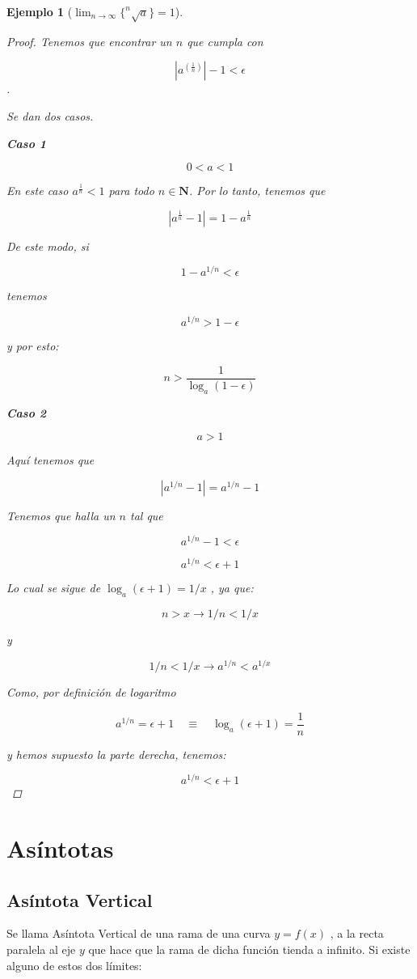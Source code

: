 \documentclass[12pt,a4paper]{article}
\newtheorem{ejs}{Ejemplo}[section]
\begin{document}
\begin{ejs}[\(\lim_{n \to \infty} \{ ^n\sqrt{a}  \} = 1\)]
\begin{proof}
Tenemos que encontrar un \( n \) que cumpla con 

\[ |a^{(\frac{1}{n})}| - 1 < \epsilon \].

Se dan dos casos.

\textbf{Caso 1}

\[ 0<a<1 \]

En este caso \( a^{\frac{1}{n}} < 1 \) para todo \( n \in \mathbf{N}
\). Por lo tanto, tenemos que


\[ |a^{\frac{1}{n}}-1| = 1 - a^{\frac{1}{n}} \]

De este modo, si


\[ 1 - a^{1/n} < \epsilon \]

tenemos


\[ a^{1/n} > 1 - \epsilon \]

y por esto:

\[ n > \frac{1 }{\log_a(1-\epsilon)} \]


\textbf{Caso 2}


\[ a > 1 \]

Aqu\'i tenemos que 


\[ | a^{1/n}-1| = a^{1/n}-1 \]

Tenemos que halla un \( n \) tal que

\[ a^{1/n}-1 < \epsilon \]

\[ a^{1/n} < \epsilon +1\]


Lo cual se sigue de \( \log_a(\epsilon+1)=1/x \) , ya que:


\[ n > x \to 1/n < 1/x \]

y


\[ 1/n < 1/x \to a^{1/n} < a^{1/x} \]

Como, por definici\'on de logaritmo


\[ a^{1/n} = \epsilon+1 \quad \equiv \quad \log_a(\epsilon+1) = \frac{1}{n} \]

y hemos supuesto la parte derecha, tenemos:


\[ a^{1/n} < \epsilon+1 \]
\end{proof}

\end{ejs}

\section{As\'intotas}

\subsection{As\'intota Vertical}
Se llama As\'intota Vertical de una rama de una curva \( y = f(x) \) , a la recta paralela al eje \( y \)  que hace que la rama de dicha funci\'on tienda a infinito. Si existe alguno de estos dos l\'imites:
\end{document}
